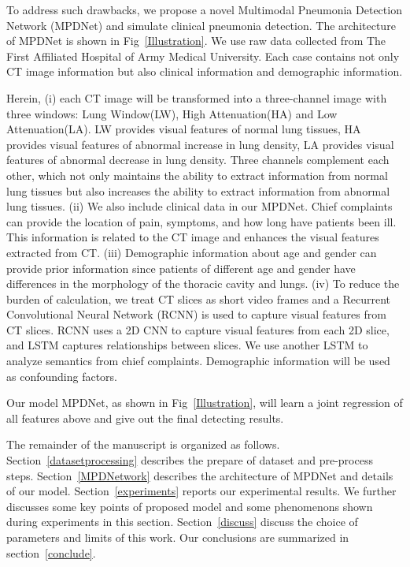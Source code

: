 \documentclass[journal]{IEEEtran}
\begin{document}
To address such drawbacks, we propose a novel Multimodal Pneumonia Detection Network (MPDNet) and simulate clinical pneumonia detection. The architecture of MPDNet is shown in Fig~\ref{Illustration}. We use raw data collected from The First Affiliated Hospital of Army Medical University. Each case contains not only CT image information but also clinical information and demographic information.
 
Herein, (i) each CT image will be transformed into a three-channel image with three windows: Lung Window(LW), High Attenuation(HA) and Low Attenuation(LA). LW provides visual features of normal lung tissues, HA provides visual features of abnormal increase in lung density, LA provides visual features of abnormal decrease in lung density. Three channels complement each other, which not only maintains the ability to extract information from normal lung tissues but also increases the ability to extract information from abnormal lung tissues.
(ii) We also include clinical data in our MPDNet. Chief complaints can provide the location of pain, symptoms, and how long have patients been ill. This information is related to the CT image and enhances the visual features extracted from CT. 
(iii) Demographic information about age and gender can provide prior information since patients of different age and gender have differences in the morphology of the thoracic cavity and lungs. 
(iv) To reduce the burden of calculation, we treat CT slices as short video frames and a Recurrent Convolutional Neural Network (RCNN) is used to capture visual features from CT slices. RCNN uses a 2D CNN to capture visual features from each 2D slice, and LSTM captures relationships between slices. We use another LSTM to analyze semantics from chief complaints. Demographic information will be used as confounding factors. 

Our model MPDNet, as shown in Fig~\ref{Illustration}, will learn a joint regression of all features above and give out the final detecting results.

The remainder of the manuscript is organized as follows. 
Section~\ref{datasetprocessing} describes the prepare of dataset and pre-process steps.
Section~\ref{MPDNetwork} describes the architecture of MPDNet and details of our model.
Section~\ref{experiments} reports our experimental results. We further discusses some key points of proposed model and some phenomenons shown during experiments in this section.
Section~\ref{discuss} discuss the choice of parameters and limits of this work.
Our conclusions are summarized in section~\ref{conclude}.
\end{document}
